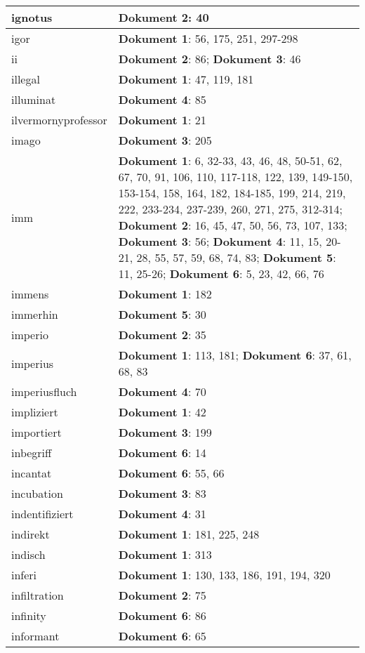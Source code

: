 \documentclass[a5paper]{article}
\begin{document}
\begin{longtable}[l]{|l|p{3in}|}
\hline
ignotus & \textbf{Dokument 2}: 40 \\
\hline
igor & \textbf{Dokument 1}: 56, 175, 251, 297-298 \\
\hline
ii & \textbf{Dokument 2}: 86; \textbf{Dokument 3}: 46 \\
\hline
illegal & \textbf{Dokument 1}: 47, 119, 181 \\
\hline
illuminat & \textbf{Dokument 4}: 85 \\
\hline
ilvermornyprofessor & \textbf{Dokument 1}: 21 \\
\hline
imago & \textbf{Dokument 3}: 205 \\
\hline
imm & \textbf{Dokument 1}: 6, 32-33, 43, 46, 48, 50-51, 62, 67, 70, 91, 106, 110, 117-118, 122, 139, 149-150, 153-154, 158, 164, 182, 184-185, 199, 214, 219, 222, 233-234, 237-239, 260, 271, 275, 312-314; \textbf{Dokument 2}: 16, 45, 47, 50, 56, 73, 107, 133; \textbf{Dokument 3}: 56; \textbf{Dokument 4}: 11, 15, 20-21, 28, 55, 57, 59, 68, 74, 83; \textbf{Dokument 5}: 11, 25-26; \textbf{Dokument 6}: 5, 23, 42, 66, 76 \\
\hline
immens & \textbf{Dokument 1}: 182 \\
\hline
immerhin & \textbf{Dokument 5}: 30 \\
\hline
imperio & \textbf{Dokument 2}: 35 \\
\hline
imperius & \textbf{Dokument 1}: 113, 181; \textbf{Dokument 6}: 37, 61, 68, 83 \\
\hline
imperiusfluch & \textbf{Dokument 4}: 70 \\
\hline
impliziert & \textbf{Dokument 1}: 42 \\
\hline
importiert & \textbf{Dokument 3}: 199 \\
\hline
inbegriff & \textbf{Dokument 6}: 14 \\
\hline
incantat & \textbf{Dokument 6}: 55, 66 \\
\hline
incubation & \textbf{Dokument 3}: 83 \\
\hline
indentifiziert & \textbf{Dokument 4}: 31 \\
\hline
indirekt & \textbf{Dokument 1}: 181, 225, 248 \\
\hline
indisch & \textbf{Dokument 1}: 313 \\
\hline
inferi & \textbf{Dokument 1}: 130, 133, 186, 191, 194, 320 \\
\hline
infiltration & \textbf{Dokument 2}: 75 \\
\hline
infinity & \textbf{Dokument 6}: 86 \\
\hline
informant & \textbf{Dokument 6}: 65 \\

\end{longtable}
\end{document}
